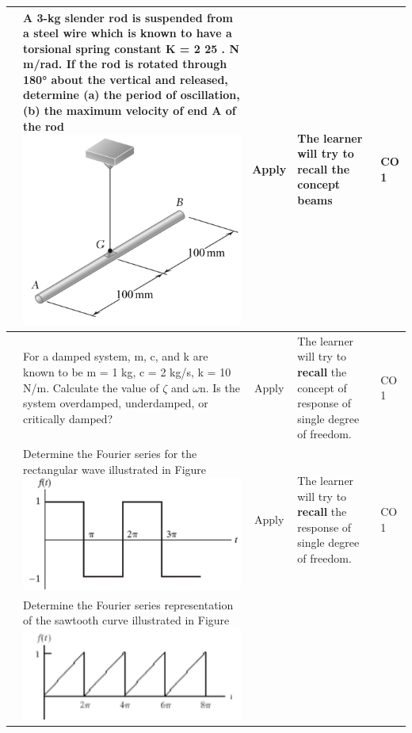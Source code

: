 \documentclass[11pt,paper=a4,answers]{exam}
\begin{document}
\begin{flushleft}
\begin{longtable}{|>{\centering\arraybackslash}p{0.8cm}  | >{\raggedright\arraybackslash}p{6.5cm}  | c | >{\raggedright\arraybackslash}p{5cm} |>{\centering\arraybackslash}p{1cm}|}
		\hline 
		4& A 3-kg slender rod is suspended from a steel wire which is known to
		have a torsional spring constant K = 2 25 . N m/rad. If the rod is rotated
		through 180° about the vertical and released, determine (a) the period of
		oscillation, (b) the maximum velocity of end A of the rod
		\includegraphics[scale=0.5]{1.png}	&	Apply&	The learner will try to \textbf{recall} the concept beams&	CO 1\\
		\hline 
		5& For a damped system, m, c, and k are known to be m = 1 kg, c = 2 kg/s, k = 10
		N/m. Calculate the value of $\zeta$ and $\omega$n. Is the system overdamped, underdamped, or
		critically damped?	&	Apply&	The learner will try to \textbf{recall} the concept of response of single degree of freedom.&	CO 1\\
		\hline 
		6& Determine the Fourier series for the rectangular wave illustrated in Figure
		\includegraphics[scale=0.5]{2.png}	&	Apply&	The learner will try to \textbf{recall} the response of single degree of freedom.&	CO 1\\
		\hline 
		7& Determine the Fourier series representation of the sawtooth curve illustrated in Figure
\includegraphics[scale=0.5]{3.png}

\end{longtable}
\end{flushleft}
\end{document}
